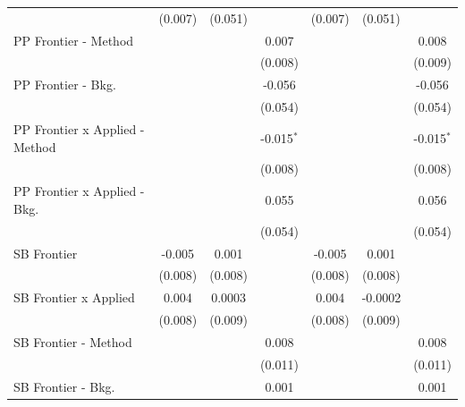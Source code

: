 \begin{tabular}{lcccccc}
                                  & (0.007)        & (0.051)      &              & (0.007)        & (0.051)      &   \\   
   PP Frontier - Method           &                &              & 0.007        &                &              & 0.008\\   
                                  &                &              & (0.008)      &                &              & (0.009)\\   
   PP Frontier - Bkg.             &                &              & -0.056       &                &              & -0.056\\   
                                  &                &              & (0.054)      &                &              & (0.054)\\   
   PP Frontier x Applied - Method &                &              & -0.015$^{*}$ &                &              & -0.015$^{*}$\\   
                                  &                &              & (0.008)      &                &              & (0.008)\\   
   PP Frontier x Applied - Bkg.   &                &              & 0.055        &                &              & 0.056\\   
                                  &                &              & (0.054)      &                &              & (0.054)\\   
   SB Frontier                    & -0.005         & 0.001        &              & -0.005         & 0.001        &   \\   
                                  & (0.008)        & (0.008)      &              & (0.008)        & (0.008)      &   \\   
   SB Frontier x Applied          & 0.004          & 0.0003       &              & 0.004          & -0.0002      &   \\   
                                  & (0.008)        & (0.009)      &              & (0.008)        & (0.009)      &   \\   
   SB Frontier - Method           &                &              & 0.008        &                &              & 0.008\\   
                                  &                &              & (0.011)      &                &              & (0.011)\\   
   SB Frontier - Bkg.             &                &              & 0.001        &                &              & 0.001\\   

\end{tabular}

